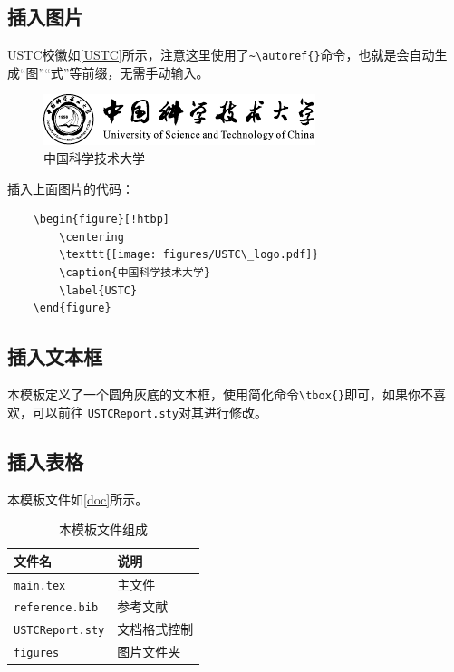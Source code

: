 \documentclass[12pt,hyperref,a4paper,UTF8]{ctexart}
\begin{document}
\subsection{插入图片}
USTC校徽如\autoref{USTC}所示，注意这里使用了\verb|~\autoref{}|命令，也就是会自动生成“图”“式”等前缀，无需手动输入。

\begin{figure}[!htbp]
    \centering
    \includegraphics[width =.4\textwidth]{figures/ustc_logo_side.pdf}
    \caption{中国科学技术大学}
    \label{USTC}
\end{figure}

插入上面图片的代码：

\begin{verbatim}
    \begin{figure}[!htbp]
        \centering
        \texttt{[image: figures/USTC\_logo.pdf]}
        \caption{中国科学技术大学}
        \label{USTC}
    \end{figure}
\end{verbatim}

\subsection{插入文本框}
本模板定义了一个圆角灰底的文本框，使用简化命令\verb|\tbox{}|即可，如果你不喜欢，可以前往 \texttt{USTCReport.sty}对其进行修改。


\subsection{插入表格}
本模板文件如\autoref{doc}所示。
\begin{table}[!htbp]
    \centering
    \begin{tabular}{l  | l}
        \hline
        文件名                  & 说明         \\
        \hline
        \texttt{main.tex}       & 主文件       \\
        \texttt{reference.bib}  & 参考文献     \\
        \texttt{USTCReport.sty} & 文档格式控制 \\
        \texttt{figures}        & 图片文件夹   \\
        \hline
    \end{tabular}
    \caption{本模板文件组成}
    \label{doc}
\end{table}
\end{document}
